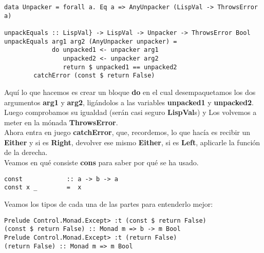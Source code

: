 \begin{minipage}{\linewidth}
\begin{small}
\begin{lstlisting}[frame=single]
data Unpacker = forall a. Eq a => AnyUnpacker (LispVal -> ThrowsError a)

unpackEquals :: LispVal} -> LispVal -> Unpacker -> ThrowsError Bool
unpackEquals arg1 arg2 (AnyUnpacker unpacker) = 
             do unpacked1 <- unpacker arg1
                unpacked2 <- unpacker arg2
                return $ unpacked1 == unpacked2
        catchError (const $ return False)
\end{lstlisting}
\end{small}
\end{minipage}

Aqu\'i lo que hacemos es crear un bloque \textbf{do} en el cual desempaquetamos los dos argumentos \textbf{arg1} y \textbf{arg2}, lig\'andolos a las variables \textbf{unpacked1} y \textbf{unpacked2}. Luego comprobamos su igualdad (ser\'an casi seguro \textbf{LispVal}s) y Los volvemos a meter en la m\'onada \textbf{ThrowsError}.\\

Ahora entra en juego \textbf{catchError}, que, recordemos, lo que hac\'ia es recibir un \textbf{Either} y si es \textbf{Right}, devolver ese mismo \textbf{Either}, si es \textbf{Left}, aplicarle la funci\'on de la derecha.\\

Veamos en qu\'e consiste \textbf{cons} para saber por qu\'e se ha usado.\\

\begin{minipage}{\linewidth}
\begin{small}
\begin{lstlisting}[frame=single]
const            :: a -> b -> a
const x _        =  x
\end{lstlisting}
\end{small}
\end{minipage}

Veamos los tipos de cada una de las partes para entenderlo mejor:\\

\begin{minipage}{\linewidth}
\begin{small}
\begin{lstlisting}[frame=single]
Prelude Control.Monad.Except> :t (const $ return False)
(const $ return False) :: Monad m => b -> m Bool
Prelude Control.Monad.Except> :t (return False)
(return False) :: Monad m => m Bool
\end{lstlisting}
\end{small}
\end{minipage}

